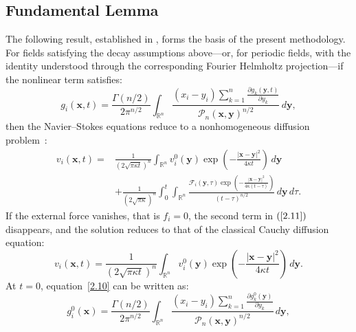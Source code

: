 \documentclass[11pt]{jfm}
\numberwithin{equation}{section}
\begin{document}
\subsection*{Fundamental Lemma}
The following result, established in \cite{tha1}, forms the basis of the present methodology. For
fields satisfying the decay assumptions above---or, for periodic fields, with the identity
understood through the corresponding Fourier Helmholtz projection---if the nonlinear term
satisfies:
\begin{equation}
\label{2.10}
g_i(\boldsymbol{x}, t) = \frac{ \Gamma(n/2) }{ 2\pi^{n/2} } \int_{\mathbb{R}^n} \frac{ (x_i - y_i) \sum_{k=1}^n \frac{\partial g_k(\boldsymbol{y}, t)}{\partial y_k} }{ \mathcal{P}_n(\boldsymbol{x}, \boldsymbol{y})^{n/2} } \, d\boldsymbol{y},
\end{equation}
then the Navier--Stokes equations reduce to a nonhomogeneous diffusion problem~\citep{car, tha2}:
\begin{equation}
\label{2.11}
\begin{aligned}
v_i(\boldsymbol{x}, t) ={}& \frac{1}{(2 \sqrt{\pi \kappa t})^n} \int_{\mathbb{R}^n} v_i^0(\boldsymbol{y}) \exp\left( -\frac{ |\boldsymbol{x} - \boldsymbol{y}|^2 }{ 4\kappa t } \right) \, d\boldsymbol{y} \\
&+ \frac{1}{(2 \sqrt{\pi \kappa})^n} \int_0^t \int_{\mathbb{R}^n} \frac{ \mathcal{F}_i(\boldsymbol{y}, \tau) \exp\left( -\frac{ |\boldsymbol{x} - \boldsymbol{y}|^2 }{ 4\kappa (t - \tau) } \right) }{ (t - \tau)^{n/2} } \, d\boldsymbol{y} \, d\tau.
\end{aligned}
\end{equation}
If the external force vanishes, that is \( f_i = 0 \), the second term in $\left(\ref{2.11}\right)$ disappears, and the solution reduces to that of the classical Cauchy diffusion equation:
\begin{equation}
\label{2.12}
v_i(\boldsymbol{x}, t) = \frac{1}{(2 \sqrt{\pi \kappa t})^n} \int_{\mathbb{R}^n} v_i^0(\boldsymbol{y}) \exp\left( -\frac{ |\boldsymbol{x} - \boldsymbol{y}|^2 }{ 4\kappa t } \right) \, d\boldsymbol{y}.
\end{equation}
At $t=0$, equation~\eqref{2.10} can be written as:
\begin{equation}
\label{2.13}
g_i^0(\boldsymbol{x}) = \frac{ \Gamma(n/2) }{ 2\pi^{n/2} } \int_{\mathbb{R}^n} \frac{ (x_i - y_i) \sum_{k=1}^n \frac{\partial g_k^0(\boldsymbol{y})}{\partial y_k} }{ \mathcal{P}_n(\boldsymbol{x}, \boldsymbol{y})^{n/2} } \, d\boldsymbol{y},
\end{equation}
\end{document}
